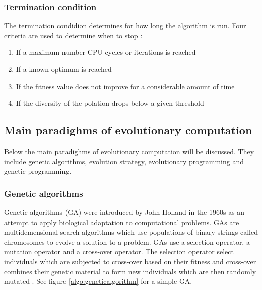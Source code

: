 \subsubsection{Termination condition}

The termination condidion determines for how long the algorithm is run. Four criteria are used to determine when to stop \cite{Eiben2015_whatevolutionary}:

\begin{enumerate}
  \item If a maximum number CPU-cycles or iterations is reached
  \item If a known optimum is reached
  \item If the fitness value does not improve for a considerable amount of time
  \item If the diversity of the polation drops below a given threshold
\end{enumerate}

\subsection{Main paradighms of evolutionary computation}

Below the main paradighms of evolutionary computation will be discussed. They include genetic algorithms, evolution strategy, evolutionary programming and genetic programming.

\subsubsection{Genetic algorithms}

Genetic algorithms (GA) were introduced by John Holland in the 1960s as an attempt to apply biological adaptation to computational problems. GAs are multidemensional search algorithms which use populations of binary strings called chromosomes to evolve a solution to a problem. GAs use a selection operator, a mutation operator and a cross-over operator. The selection operator select individuals which are subjected to cross-over based on their fitness and cross-over combines their genetic material to form new individuals which are then randomly mutated \cite{mitchel1999evolutionary}. See figure \ref{algo:geneticalgorithm} for a simple GA.

